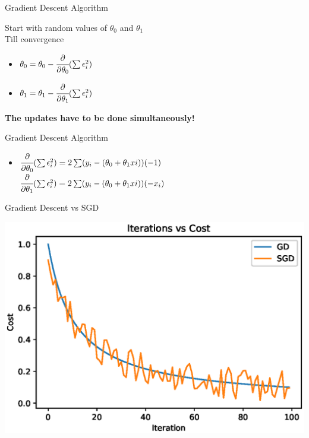 \documentclass{beamer}
\begin{document}
	\begin{frame}{Gradient Descent Algorithm}
		
		Start with random values of $\theta_{0}$ and $\theta_{1}$\\
		Till convergence
		\begin{itemize}
			\item $\theta_{0} = \theta_{0} - \cfrac{\partial}{\partial \theta_{0}} (\sum \epsilon_{i}^{2}) $
			\item $\theta_{1} = \theta_{1} - \cfrac{\partial}{\partial \theta_{1}} (\sum \epsilon_{i}^{2}) $
		\end{itemize}
		
		\textbf{The updates have to be done simultaneously!}
	\end{frame}
	
	\begin{frame}{Gradient Descent Algorithm}
		
		\begin{itemize}
			\item $\cfrac{\partial}{\partial \theta_{0}} (\sum \epsilon_{i}^{2}) = 2\sum (y_{i} - (\theta_{0} + \theta_{1}x{i}))(-1)$
			$\cfrac{\partial}{\partial \theta_{1}} (\sum \epsilon_{i}^{2}) = 2\sum (y_{i} - (\theta_{0} + \theta_{1}x{i}))(-x_{i})$
		\end{itemize}
	\end{frame}
	
	\begin{frame}{Gradient Descent vs SGD}
		\begin{center}
			\includegraphics[totalheight=6cm]{gradient-descent/gd-sgd.eps}
		\end{center}
	\end{frame}
	
\end{document}
